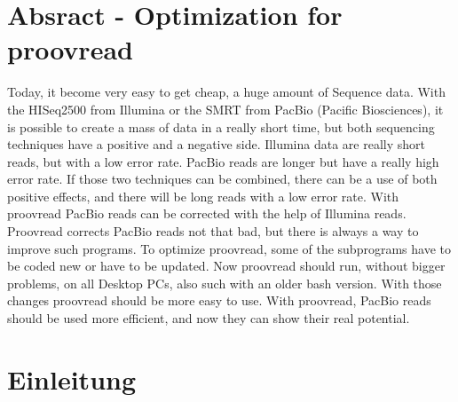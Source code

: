 \documentclass{scrartcl}
\begin{document}
\section{Absract - Optimization for proovread}
\label{sec-2}
Today, it become very easy to get cheap, a huge amount of Sequence data. With the HISeq2500 from Illumina or the SMRT from PacBio (Pacific Biosciences), 
it is possible to create a mass of data in a really short time, but both sequencing techniques have a positive and a negative side. 
Illumina data are really short reads, but with a low error rate. PacBio reads are longer but have a really high error rate. 
If those two techniques can be combined, there can be a use of both positive effects, and there will be long reads with a low error rate. 
With proovread PacBio reads can be corrected with the help of Illumina reads. Proovread corrects PacBio reads not that bad, but there is always a way to improve 
such programs. To optimize proovread, some of the subprograms have to be coded new or have to be updated. Now proovread should run, without bigger problems, on 
all Desktop PCs, also such with an older bash version. With those changes proovread should be more easy to use. With proovread, PacBio reads should be used 
more efficient, and now they can show their real potential.
\clearpage

\section{Einleitung}
\label{sec-3}
\end{document}

